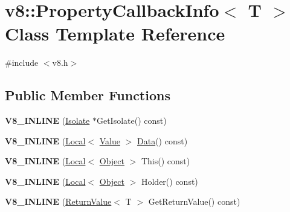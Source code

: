 \hypertarget{classv8_1_1_property_callback_info}{}\section{v8\+:\+:Property\+Callback\+Info$<$ T $>$ Class Template Reference}
\label{classv8_1_1_property_callback_info}


{\ttfamily \#include $<$v8.\+h$>$}

\subsection*{Public Member Functions}
\begin{DoxyCompactItemize}
\item 
\hypertarget{classv8_1_1_property_callback_info_a1891f6f100d63a9da30a1915fe7019ee}{}{\bfseries V8\+\_\+\+I\+N\+L\+I\+N\+E} (\hyperlink{classv8_1_1_isolate}{Isolate} $\ast$Get\+Isolate() const)\label{classv8_1_1_property_callback_info_a1891f6f100d63a9da30a1915fe7019ee}

\item 
\hypertarget{classv8_1_1_property_callback_info_ad8a40e43d24fb90409e01afbe936c24b}{}{\bfseries V8\+\_\+\+I\+N\+L\+I\+N\+E} (\hyperlink{classv8_1_1_local}{Local}$<$ \hyperlink{classv8_1_1_value}{Value} $>$ \hyperlink{classv8_1_1_data}{Data}() const)\label{classv8_1_1_property_callback_info_ad8a40e43d24fb90409e01afbe936c24b}

\item 
\hypertarget{classv8_1_1_property_callback_info_a8be5cdede554354893ae3912d1f43c5f}{}{\bfseries V8\+\_\+\+I\+N\+L\+I\+N\+E} (\hyperlink{classv8_1_1_local}{Local}$<$ \hyperlink{classv8_1_1_object}{Object} $>$ This() const)\label{classv8_1_1_property_callback_info_a8be5cdede554354893ae3912d1f43c5f}

\item 
\hypertarget{classv8_1_1_property_callback_info_ae7677bfc686bec3dacb5a87323a3b709}{}{\bfseries V8\+\_\+\+I\+N\+L\+I\+N\+E} (\hyperlink{classv8_1_1_local}{Local}$<$ \hyperlink{classv8_1_1_object}{Object} $>$ Holder() const)\label{classv8_1_1_property_callback_info_ae7677bfc686bec3dacb5a87323a3b709}

\item 
\hypertarget{classv8_1_1_property_callback_info_a1c2e5afeb9e04619deb17d555d37c126}{}{\bfseries V8\+\_\+\+I\+N\+L\+I\+N\+E} (\hyperlink{classv8_1_1_return_value}{Return\+Value}$<$ T $>$ Get\+Return\+Value() const)\label{classv8_1_1_property_callback_info_a1c2e5afeb9e04619deb17d555d37c126}

\end{DoxyCompactItemize}
